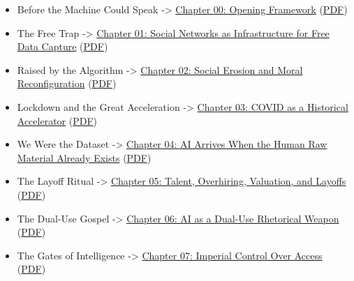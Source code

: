 \documentclass[
  american,
  12pt,
  letterpaper,
]{article}
\providecommand{\tightlist}{%
  \setlength{\itemsep}{0pt}\setlength{\parskip}{0pt}}
\begin{document}
\begin{itemize}
\tightlist
\item
  Before the Machine Could Speak -\textgreater{}
  \href{../../papers/html/00_opening-framework_paper.html}{Chapter 00:
  Opening Framework}
  (\href{../../papers/pdf/00_opening-framework_paper/00_opening-framework_paper.pdf}{PDF})
\item
  The Free Trap -\textgreater{}
  \href{../../papers/html/01_social-networks-data-capture_paper.html}{Chapter
  01: Social Networks as Infrastructure for Free Data Capture}
  (\href{../../papers/pdf/01_social-networks-data-capture_paper/01_social-networks-data-capture_paper.pdf}{PDF})
\item
  Raised by the Algorithm -\textgreater{}
  \href{../../papers/html/02_social-erosion-and-moral-reconfiguration_paper.html}{Chapter
  02: Social Erosion and Moral Reconfiguration}
  (\href{../../papers/pdf/02_social-erosion-and-moral-reconfiguration_paper/02_social-erosion-and-moral-reconfiguration_paper.pdf}{PDF})
\item
  Lockdown and the Great Acceleration -\textgreater{}
  \href{../../papers/html/03_covid-historical-accelerator_paper.html}{Chapter
  03: COVID as a Historical Accelerator}
  (\href{../../papers/pdf/03_covid-historical-accelerator_paper/03_covid-historical-accelerator_paper.pdf}{PDF})
\item
  We Were the Dataset -\textgreater{}
  \href{../../papers/html/04_data-models-weights_paper.html}{Chapter 04:
  AI Arrives When the Human Raw Material Already Exists}
  (\href{../../papers/pdf/04_data-models-weights_paper/04_data-models-weights_paper.pdf}{PDF})
\item
  The Layoff Ritual -\textgreater{}
  \href{../../papers/html/05_talent-overhiring-layoffs_paper.html}{Chapter
  05: Talent, Overhiring, Valuation, and Layoffs}
  (\href{../../papers/pdf/05_talent-overhiring-layoffs_paper/05_talent-overhiring-layoffs_paper.pdf}{PDF})
\item
  The Dual-Use Gospel -\textgreater{}
  \href{../../papers/html/06_dual-use-rhetorical-weapon_paper.html}{Chapter
  06: AI as a Dual-Use Rhetorical Weapon}
  (\href{../../papers/pdf/06_dual-use-rhetorical-weapon_paper/06_dual-use-rhetorical-weapon_paper.pdf}{PDF})
\item
  The Gates of Intelligence -\textgreater{}
  \href{../../papers/html/07_imperial-control-over-access_paper.html}{Chapter
  07: Imperial Control Over Access}
  (\href{../../papers/pdf/07_imperial-control-over-access_paper/07_imperial-control-over-access_paper.pdf}{PDF})

\end{itemize}
\end{document}
